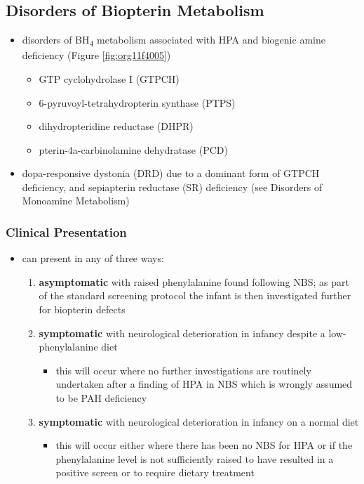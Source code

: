 \documentclass[12pt]{scrartcl}
\begin{document}
\subsection{Disorders of Biopterin Metabolism}
\label{sec:orge626998}
\begin{itemize}
\item disorders of BH\textsubscript{4} metabolism associated with HPA and biogenic amine deficiency (Figure \ref{fig:org11f4005})
\begin{itemize}
\item GTP cyclohydrolase I (GTPCH)
\item 6-pyruvoyl-tetrahydropterin synthase (PTPS)
\item dihydropteridine reductase (DHPR)
\item pterin-4a-carbinolamine dehydratase (PCD)
\end{itemize}
\item dopa-responsive dystonia (DRD) due to a dominant form of GTPCH
deficiency, and sepiapterin reductase (SR) deficiency (see Disorders of Monoamine Metabolism)
\end{itemize}
\subsubsection{Clinical Presentation}
\label{sec:org8b34231}
\begin{itemize}
\item can present in any of three ways:
\begin{enumerate}
\item \textbf{asymptomatic} with raised phenylalanine found following NBS; as part of
the standard screening protocol the infant is then investigated
further for biopterin defects
\item \textbf{symptomatic} with neurological deterioration in infancy despite a
low-phenylalanine diet
\begin{itemize}
\item this will occur where no further investigations are routinely
undertaken after a finding of HPA in NBS which is wrongly
assumed to be PAH deficiency
\end{itemize}
\item \textbf{symptomatic} with neurological deterioration in infancy on a
normal diet
\begin{itemize}
\item this will occur either where there has been no NBS for HPA or
if the phenylalanine level is not sufficiently raised to have
resulted in a positive screen or to require dietary treatment
\end{itemize}
\end{enumerate}
\end{itemize}
\end{document}
